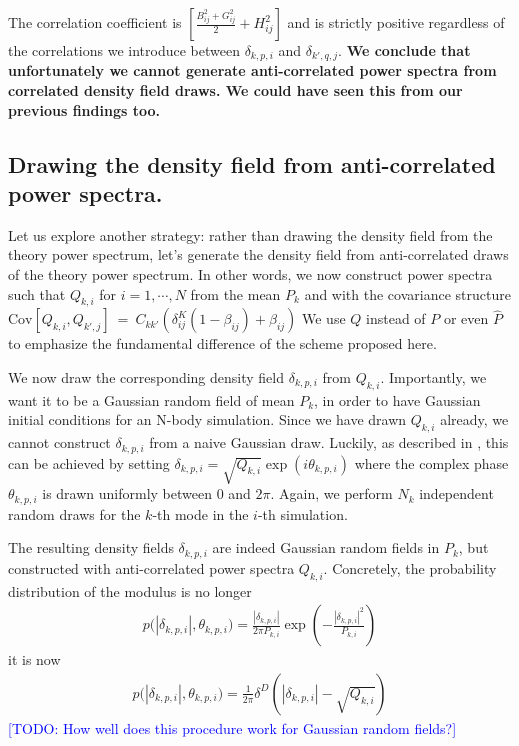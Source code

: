 \documentclass{aastex6}
\newcommand{\eqn}[1]{\begin{eqnarray}#1\end{eqnarray}}
\newcommand{\todo}[1]{\textcolor{blue}{[TODO: #1]}}
\begin{document}
 

The correlation coefficient is $\left[  \frac{B^2_{ij} + G^2_{ij}}{2}  + H^2_{ij}\right]$ and is strictly positive regardless of the correlations we introduce between $\delta_{k, p, i}$ and $\delta_{k', q, j}$.
\textbf{We conclude that unfortunately we cannot generate anti-correlated power spectra from correlated density field draws. We could have seen this from our previous findings too.}


\subsection{Drawing the density field from anti-correlated power spectra.}

Let us explore another strategy: rather than drawing the density field from the theory power spectrum, let's generate the density field from anti-correlated draws of the theory power spectrum. 
In other words, we now construct power spectra such that $Q_{k, i}$ for $i=1, \cdots, N$ from the mean $P_{k}$ and with the covariance structure $\mathrm{Cov}[{Q}_{k, i}, {Q}_{k', j}] \ = \ C_{kk'} \left( \delta^K_{ij}(1-\beta_{ij}) + \beta_{ij} \right)$
We use $Q$ instead of $P$ or even $\hat{P}$ to emphasize the fundamental difference of the scheme proposed here.

We now draw the corresponding density field $\delta_{k, p, i}$ from $Q_{k, i}$. Importantly, we want it to be a Gaussian random field of mean $P_{k}$, in order to have Gaussian initial conditions for an N-body simulation. 
Since we have drawn $Q_{k, i}$ already, we cannot construct $\delta_{k, p, i}$ from a naive Gaussian draw.
Luckily, as described in \cite{AnguloPontzen2016}, this can be achieved by setting 
$\delta_{k, p, i} = \sqrt{Q_{k, i}} \exp(i\theta_{k, p, i})$
where the complex phase $\theta_{k, p, i}$ is drawn uniformly between $0$ and $2\pi$.
Again, we perform $N_k$ independent random draws for the $k$-th mode in the $i$-th simulation.

The resulting density fields $\delta_{k, p, i} $ are indeed Gaussian random fields in $P_k$, but constructed with anti-correlated power spectra $Q_{k, i}$.
Concretely, the probability distribution of the modulus is no longer
\eqn{
	p\bigl(|\delta_{k, p, i}|, \theta_{k, p, i}\bigr) = \frac{|\delta_{k, p, i}|}{2\pi P_{k, i}} \exp\left( -\frac{|\delta_{k, p, i}|^2}{P_{k, i}}\right)
}
it is now
\eqn{
	p\bigl(|\delta_{k, p, i}|, \theta_{k, p, i}\bigr) = \frac{1}{2\pi} \delta^D\left(|\delta_{k, p, i}| - \sqrt{Q_{k, i}}\right)
}
\todo{How well does this procedure work for Gaussian random fields?}
\end{document}
